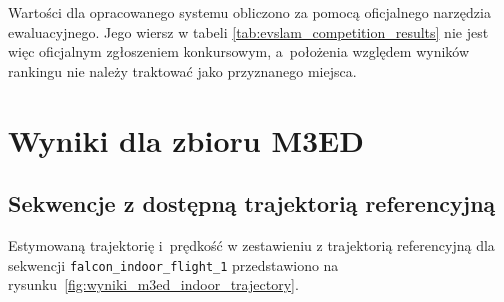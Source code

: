 Wartości dla opracowanego systemu obliczono za pomocą oficjalnego narzędzia ewaluacyjnego. Jego wiersz w tabeli \ref{tab:evslam_competition_results} nie jest więc oficjalnym zgłoszeniem konkursowym, a~położenia względem wyników rankingu nie należy traktować jako przyznanego miejsca.

\clearpage

\section{Wyniki dla zbioru M3ED}
\label{sec:wyniki_m3ed}

\subsection{Sekwencje z dostępną trajektorią referencyjną}
\label{subsec:wyniki_m3ed_gt}

Estymowaną trajektorię i~prędkość w zestawieniu z trajektorią referencyjną dla sekwencji \texttt{falcon\_indoor\_flight\_1} przedstawiono na rysunku~\ref{fig:wyniki_m3ed_indoor_trajectory}.

\begin{table}[!ht]
    \centering
    \small
    \caption{Wyniki pełnych przebiegów dwóch sekwencji M3ED z~dostępną trajektorią referencyjną, w~protokołach określonych w~metodyce.}
    \label{tab:wyniki_m3ed_gt}
\end{table}

